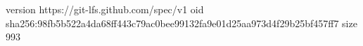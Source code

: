 version https://git-lfs.github.com/spec/v1
oid sha256:98fb5b522a4da68ff443c79ac0bee99132fa9e01d25aa973d4f29b25bf457ff7
size 993
